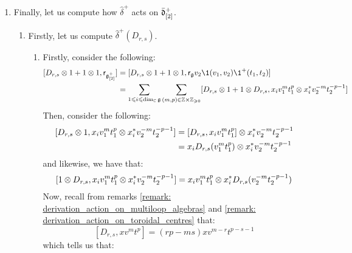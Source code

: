 \begin{remark}
\begin{enumerate}
                    \item Finally, let us compute how $\hat{\delta}^+$ acts on $\bar{\d}_{[2]}^+$. 
                    \begin{enumerate}
                        \item Firstly, let us compute $\hat{\delta}^+(D_{r, s})$. 
                        \begin{enumerate}
                            \item Firstly, consider the following:
                                $$
                                    \begin{aligned}
                                        [D_{r, s} \tensor 1 + 1 \tensor 1, \sfr_{\g_{[2]}^+}] & = [D_{r, s} \tensor 1 + 1 \tensor 1, \sfr_{\g} v_2 \1(v_1, v_2) \1^+(t_1, t_2)]
                                        \\
                                        & = \sum_{1 \leq i \leq \dim_{\bbC} \g} \sum_{(m, p) \in \Z \x \Z_{\geq 0}} [D_{r, s} \tensor 1 + 1 \tensor D_{r, s}, x_i v_1^m t_1^p \tensor x_i^* v_2^{-m} t_2^{-p - 1}]
                                    \end{aligned}
                                $$
                            Then, consider the following:
                                $$
                                    \begin{aligned}
                                        [D_{r, s} \tensor 1, x_i v_1^m t_1^p \tensor x_i^* v_2^{-m} t_2^{-p - 1}] & = [D_{r, s}, x_i v_1^m t_1^p] \tensor x_i^* v_2^{-m} t_2^{-p - 1}
                                        \\
                                        & = x_i D_{r, s}(v_1^m t_1^p) \tensor x_i^* v_2^{-m} t_2^{-p - 1}
                                    \end{aligned}
                                $$
                            and likewise, we have that:
                                $$[1 \tensor D_{r, s}, x_i v_1^m t_1^p \tensor x_i^* v_2^{-m} t_2^{-p - 1}] = x_i v_1^m t_1^p \tensor x_i^* D_{r, s}(v_2^{-m} t_2^{-p - 1})$$
                            Now, recall from remarks \ref{remark: derivation_action_on_multiloop_algebras} and \ref{remark: derivation_action_on_toroidal_centres} that:
                                $$[D_{r, s}, x v^m t^p] = (rp - ms) x v^{m - r} t^{p - s - 1}$$
                            which tells us that:
                                $$
                                    \begin{aligned}

\end{aligned}$$
\end{enumerate}
\end{enumerate}
\end{enumerate}
\end{remark}
